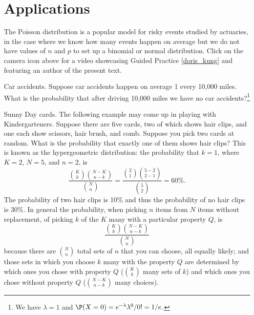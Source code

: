 
\section[Applications]{Applications }
The Poisson distribution is a popular model for risky events studied by actuaries, in the case where we know how many events happen on average but we do not have values of $n$ and $p$ to set up a binomial or normal distribution. Click on the camera icon above for a video showcasing Guided Practice \ref{doris_kung} and featuring an author of the present text.
\begin{exercise}{Car accidents.}\label{doris_kung}
Suppose car accidents happen on average 1 every 10,000 miles.
What is the probability that after driving 10,000 miles we have no car accidents?\footnote{We have $\lambda=1$ and $\P(X=0)=e^{-\lambda}\lambda^0/0! = 1/e$.}
\end{exercise}

\begin{example}{Sunny Day cards.}
The following example may come up in playing with Kindergarteners. Suppose there are five cards, two of which shows hair clips, and one each show scissors, hair brush, and comb.
Suppose you pick two cards at random. What is the probability that exactly one of them shows hair clips?
This is known as the hypergeometric distribution: the probability that $k= 1$, where $K=2$, $N=5$, and $n=2$, is
\[
	\frac{
		\binom{K}{k}
		\binom{N-K}{n-k}
	}{
		\binom{N}{n}
	}
	= 
	\frac{
		\binom{2}{1}
		\binom{5-2}{2-1}
	}{
		\binom{5}{2}
	}
	= 60\%.
\]
The probability of two hair clips is 10\% and thus the probability of no hair clips is 30\%.
In general the probability, when picking $n$ items from $N$ items without replacement, of picking $k$ of the $K$ many with a particular property $Q$, is
\[
	\frac{
		\binom{K}{k}
		\binom{N-K}{n-k}
	}{
		\binom{N}{n}
	}
\]
because there are $\binom{N}{n}$ total sets of $n$ that you can choose, all equally likely; and those sets in which you choose $k$ many with the property $Q$ are determined by which ones you chose with
property $Q$ ($\binom{K}{k}$ many sets of $k$) and which ones you chose without property $Q$ ($\binom{N-K}{n-k}$ many choices).
\end{example}

